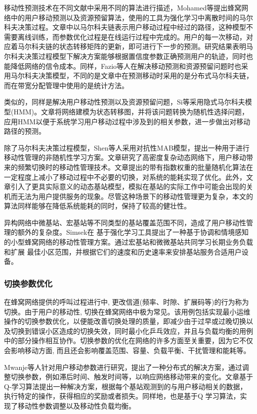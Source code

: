 \documentclass{IEEEtran}
\begin{document}
移动性预测技术在不同文献中采用不同的算法进行描述，Mohamed等\cite{Mohamed2015}提出蜂窝网络中的用户移动预测以及资源预留算法，使用的工具为强化学习中离散时间的马尔科夫决策过程。文章中以马尔科夫链表示用户移动过程中经过的路径，这种模型不需要离线训练，而参数优化过程是在线运行过程中完成的。用户的每一次移动，对应着马尔科夫链的状态转移矩阵的更新，即可进行下一步的预测。研究结果表明马尔科夫决策过程模型下解决方案能够根据置信度参数正确预测用户的轨迹，同时也能降低网络的信令成本。同样，Fazio等人\cite{Fazio2013}在解决移动预测和资源预留问题时也采用马尔科夫决策模型，不同的是文章中在预测移动时采用的是分布式马尔科夫链，而在带宽分配管理中使用的是统计方法。

类似的，同样是解决用户移动性预测以及资源预留问题，Si等\cite{Si2010}采用隐式马尔科夫模型(HMM)。文章将网络建模为状态转移图，并将该问题转换为随机性选择问题，应用HMM以便于系统学习用户移动过程中涉及到的相关参数，进一步做出对移动路径的预测。

除了马尔科夫决策过程模型，Shen等人采用对抗性MAB模型\cite{Shen2016}，提出一种用于进行移动性管理的非随机性学习方案。文章研究了高密度复杂动态网络下，用户移动带来的频繁切换时的移动性管理技术。文章提出的带有指数权重的批量随机化算法在一定程度上减小了移动过程中不必要的切换，对系统的能耗实现了优化。此外，文章引入了更具实际意义的动态基站模型，模拟在基站的实际工作中可能会出现的关机而无法为用户提供服务的现象。尽管这种场景下的移动性管理更为复杂，本文的算法同样能够在降低系统能耗的同时，保持了较高的健壮性。

异构网络中微基站、宏基站等不同类型的基站覆盖范围不同，造成了用户移动性管理的额外的复杂度。Simsek在
\cite{Simsek2015a}基于强化学习工具提出了一种基于协调和情境感知的小型蜂窝网络的移动性管理方案。通过宏基站和微微基站共同学习长期业务负载和扩展 最佳小区范围，并根据它们的速度和历史速率来安排基站服务合适用户设备。

\subsubsection{切换参数优化}
在蜂窝网络提供的呼叫过程进行中, 更改信道(频率、时隙、扩展码等)的行为称为 切换。由于用户的移动性, 切换在蜂窝网络中极为常见。该用例包括实现最小运维操作的切换参数优化，以便能改善切换处理的质量，即减少由于过早或过晚切换以及切换到错误小区造成的切换失效，同时最小化乒乓效应，并且与负载均衡的用例中的部分操作相互协作。切换参数的优化在网络的许多方面至关重要，因为它不仅会影响移动方面, 而且还会影响覆盖范围、容量、负载平衡、干扰管理和能耗等。


Mwanje等人\cite{Mwanje2014}针对用户移动参数进行研究，提出了一种分布式的解决方案，通过调整切换参数，例如滞后时间、触发时间等，以响应网络移动带来的变化。文章基于Q-学习算法提出一种解决方案，根据每个基站观测到的与用户移动相关的数据，执行特定的操作，获得相应的奖励或者损失。同样地，\cite{Mwanje2013}也是基于Q 学习算法，实现了移动性参数调整以及移动性负载均衡。
\end{document}
